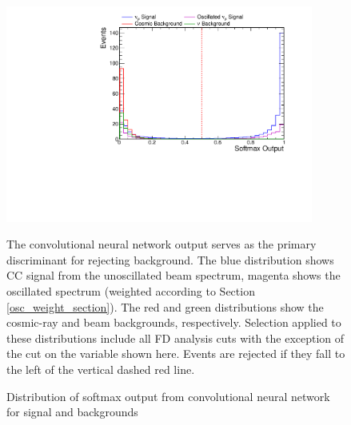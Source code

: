 \begin{figure}
\begin{center}
\includegraphics[width=0.9\textwidth]{figures/selection/n1_cvnnumu.pdf}
\end{center}
\caption{Distribution of softmax output from convolutional neural network for signal and backgrounds}{
The convolutional neural network output serves as the primary discriminant for
rejecting background.
The blue distribution shows \numu CC signal from the unoscillated beam spectrum,
magenta shows the oscillated spectrum (weighted according to Section
\ref{osc_weight_section}).
The red and green distributions show the cosmic-ray and beam backgrounds,
respectively.
Selection applied to these distributions include all FD analysis cuts
with the exception of the cut on the variable shown here.
Events are rejected if they fall to the left of the vertical
dashed red line.
}
\label{cvnnumu}
\end{figure}


